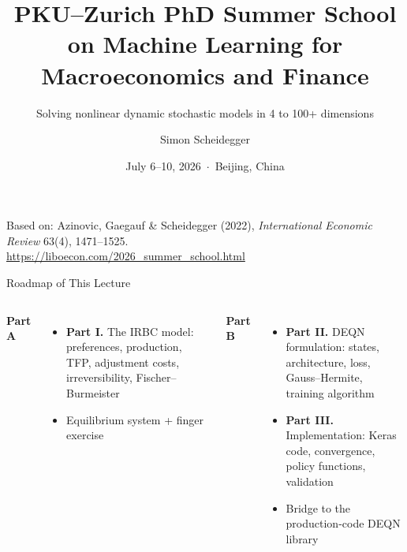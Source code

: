 \documentclass[aspectratio=169,11pt]{beamer}
\title[PKU--Zurich Summer School 2026]
{PKU--Zurich PhD Summer School on Machine Learning for Macroeconomics and Finance}
\subtitle{Solving nonlinear dynamic stochastic models in 4 to 100+ dimensions}
\author{Simon Scheidegger}
\institute{HEC Lausanne $\cdot$ University of Zurich}
\date{July 6--10, 2026 \,$\cdot$\, Beijing, China}
\begin{document}
\newcommand{\exercisepause}{%
  \tikz[baseline=(X.base)]{\node[fill=darkgreen!80!black, text=white,
  rounded corners=2pt, inner sep=3pt, font=\scriptsize\bfseries](X){PAUSE --- 5 min};}}



{
\begin{frame}
\titlepage
\vspace{-0.4cm}
\begin{center}
{\footnotesize Based on: Azinovic, Gaegauf \& Scheidegger (2022), \emph{International Economic Review} 63(4), 1471--1525.}\\[8pt]
{\footnotesize \url{https://liboecon.com/2026_summer_school.html}}
\end{center}
\end{frame}
}

\begin{frame}{Roadmap of This Lecture}
\vspace{0.2em}
\begin{columns}[T]
\textbf{Part A}
\begin{itemize}
    \item \textbf{Part I.} The IRBC model: preferences, production, TFP, adjustment costs, irreversibility, Fischer--Burmeister
    \item Equilibrium system + finger exercise
\end{itemize}

\textbf{Part B}
\begin{itemize}
    \item \textbf{Part II.} DEQN formulation: states, architecture, loss, Gauss--Hermite, training algorithm
    \item \textbf{Part III.} Implementation: Keras code, convergence, policy functions, validation
    \item Bridge to the production-code DEQN library
\end{itemize}
\end{columns}
\end{frame}
\end{document}
